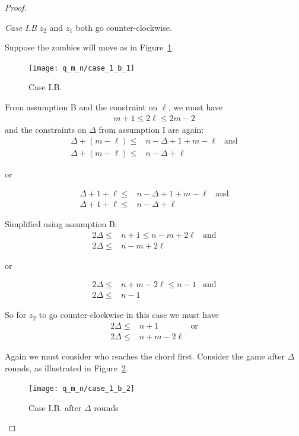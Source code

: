 \begin{proof}
\begin{proofpart}
  \textit{Case I.B} $z_2$ and $z_1$ both go counter-clockwise.

  Suppose the zombies will move as in Figure~\ref{fig:case_1_b_1}.
  \begin{figure}
    \centering
    \texttt{[image: q\_m\_n/case\_1\_b\_1]}
    \caption{Case I.B. \label{fig:case_1_b_1}}
  \end{figure}

  From assumption B and the constraint on $\ell$, we must have
  \begin{align*}
   m + 1 \leq 2 \ell \leq 2m - 2
  \end{align*}
  and the constraints on $\Delta$ from assumption I are again:
  \begin{align*}
   \Delta + (m - \ell) \leq & n - \Delta + 1 + m - \ell & \text{and} \\
   \Delta + (m - \ell) \leq & n - \Delta + \ell
  \end{align*}
  \begin{center}or\end{center}
  \begin{align*}
   \Delta + 1 + \ell \leq & n - \Delta + 1 + m - \ell & \text{and} \\
   \Delta + 1 + \ell \leq & n - \Delta + \ell
  \end{align*}

  Simplified using assumption B:
  \begin{align*}
   2 \Delta \leq & n+1 \leq n-m+2\ell & \text{and} \\
   2 \Delta \leq & n - m + 2\ell
  \end{align*}
  \begin{center}or\end{center}
  \begin{align*}
   2 \Delta \leq & n+m -2 \ell \leq n-1 & \text{and} \\
   2 \Delta \leq & n -1
  \end{align*}

  So for $z_2$ to go counter-clockwise in this case we must have
  \begin{align*}
   2 \Delta \leq & n + 1         & \text{or} \\
   2 \Delta \leq & n + m - 2\ell
  \end{align*}

  Again we must consider who reaches the chord first. Consider the game after $\Delta$ rounds, as illustrated in Figure~\ref{fig:case_1_b_2}.

  \begin{figure}
    \centering
    \texttt{[image: q\_m\_n/case\_1\_b\_2]}
    \caption{Case I.B. after $\Delta$ rounds \label{fig:case_1_b_2}}
  \end{figure}


\end{proofpart}
\end{proof}
